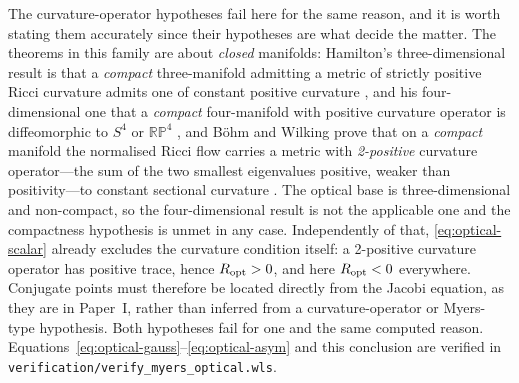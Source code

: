 \documentclass[12pt]{iopart}
\theoremstyle{plain}
\theoremstyle{definition}
\theoremstyle{remark}
\begin{document}
The curvature-operator hypotheses fail here for the same reason, and it is worth
stating them accurately since their hypotheses are what decide the matter. The
theorems in this family are about \emph{closed} manifolds: Hamilton's
three-dimensional result is that a \emph{compact} three-manifold admitting a metric
of strictly positive Ricci curvature admits one of constant positive curvature
\cite[Thm.~1.1]{Hamilton1982}, and his four-dimensional one that a \emph{compact}
four-manifold with positive curvature operator is diffeomorphic to $S^4$ or
$\mathbb{RP}^4$ \cite[Thm.~1.1]{Hamilton1986}, and B\"ohm and Wilking prove
that on a \emph{compact} manifold the normalised Ricci flow carries a metric with
\emph{2-positive} curvature operator---the sum of the two smallest eigenvalues
positive, weaker than positivity---to constant sectional curvature
\cite[Thm.~1]{BoehmWilking2008}. The optical base is three-dimensional and
non-compact, so the four-dimensional result is not the applicable one and the
compactness hypothesis is unmet in any case. Independently of that,
\eqref{eq:optical-scalar} already excludes the curvature condition itself: a
2-positive curvature operator has positive trace, hence $R_{\rm opt}>0$, and here
$R_{\rm opt}<0$ everywhere. Conjugate points must therefore be located directly
from the Jacobi equation, as they are in Paper~I, rather than inferred from a
curvature-operator or Myers-type hypothesis. Both hypotheses fail for one and the
same computed reason. Equations~\eqref{eq:optical-gauss}--\eqref{eq:optical-asym}
and this conclusion are verified in
\texttt{verification/verify\_myers\_optical.wls}.
\end{document}
